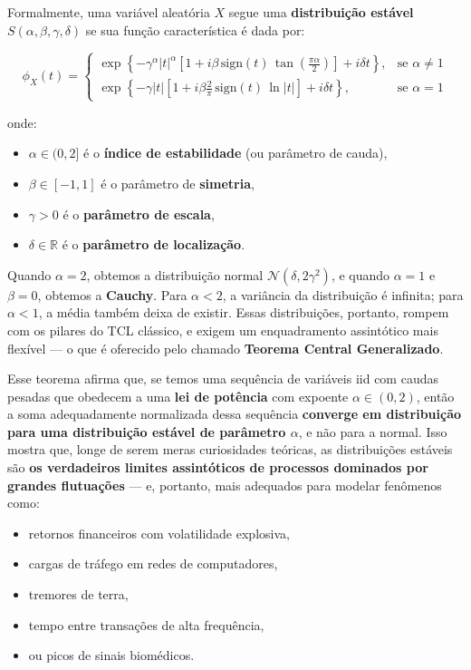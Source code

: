 \documentclass[
]{agujournal2019}
\providecommand{\tightlist}{%
  \setlength{\itemsep}{0pt}\setlength{\parskip}{0pt}}\usepackage{longtable,booktabs,array}
\begin{document}
Formalmente, uma variável aleatória \(X\) segue uma \textbf{distribuição
estável} \(S(\alpha, \beta, \gamma, \delta)\) se sua função
característica é dada por:

\[
\phi_X(t) = 
\begin{cases}
\exp\left\{ -\gamma^\alpha |t|^\alpha \left[1 + i \beta \, \text{sign}(t) \, \tan\left(\frac{\pi \alpha}{2}\right)\right] + i\delta t \right\}, & \text{se } \alpha \neq 1 \\
\exp\left\{ -\gamma |t| \left[1 + i \beta \frac{2}{\pi} \, \text{sign}(t) \, \ln|t|\right] + i\delta t \right\}, & \text{se } \alpha = 1
\end{cases}
\]

onde:

\begin{itemize}
\tightlist
\item
  \(\alpha \in (0, 2]\) é o \textbf{índice de estabilidade} (ou
  parâmetro de cauda),
\item
  \(\beta \in [-1,1]\) é o parâmetro de \textbf{simetria},
\item
  \(\gamma > 0\) é o \textbf{parâmetro de escala},
\item
  \(\delta \in \mathbb{R}\) é o \textbf{parâmetro de localização}.
\end{itemize}

Quando \(\alpha = 2\), obtemos a distribuição normal
\(\mathcal{N}(\delta, 2\gamma^2)\), e quando \(\alpha = 1\) e
\(\beta = 0\), obtemos a \textbf{Cauchy}. Para \(\alpha < 2\), a
variância da distribuição é infinita; para \(\alpha < 1\), a média
também deixa de existir. Essas distribuições, portanto, rompem com os
pilares do TCL clássico, e exigem um enquadramento assintótico mais
flexível --- o que é oferecido pelo chamado \textbf{Teorema Central
Generalizado}.

Esse teorema afirma que, se temos uma sequência de variáveis iid com
caudas pesadas que obedecem a uma \textbf{lei de potência} com expoente
\(\alpha \in (0,2)\), então a soma adequadamente normalizada dessa
sequência \textbf{converge em distribuição para uma distribuição estável
de parâmetro \(\alpha\)}, e não para a normal. Isso mostra que, longe de
serem meras curiosidades teóricas, as distribuições estáveis são
\textbf{os verdadeiros limites assintóticos de processos dominados por
grandes flutuações} --- e, portanto, mais adequados para modelar
fenômenos como:

\begin{itemize}
\tightlist
\item
  retornos financeiros com volatilidade explosiva,
\item
  cargas de tráfego em redes de computadores,
\item
  tremores de terra,
\item
  tempo entre transações de alta frequência,
\item
  ou picos de sinais biomédicos.
\end{itemize}
\end{document}

